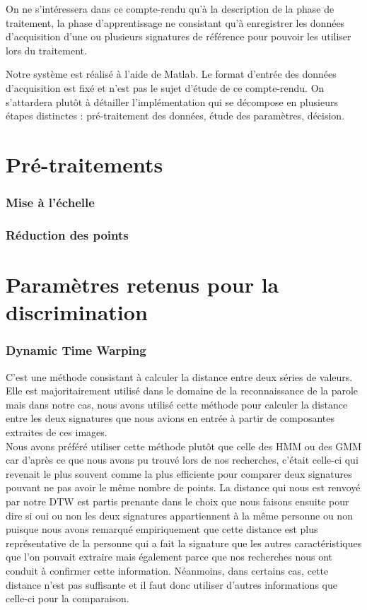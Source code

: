 \documentclass[fontsize=12pt, twoside=no]{scrartcl} %
\begin{document}
On ne s'intéressera dans ce compte-rendu qu'à la description de la phase de traitement, la phase d'apprentissage ne consistant qu'à enregistrer les données d'acquisition d'une ou plusieurs signatures de référence pour pouvoir les utiliser lors du traitement.

Notre système est réalisé à l'aide de Matlab. Le format d'entrée des données d'acquisition est fixé et n'est pas le sujet d'étude de ce compte-rendu. On s'attardera plutôt à détailler l'implémentation qui se décompose en plusieurs étapes distinctes : pré-traitement des données, étude des paramètres, décision.

\part{Pré-traitements}

\section{Mise à l'échelle}
\section{Réduction des points}

\part{Paramètres retenus pour la discrimination}

\section{Dynamic Time Warping}

C'est une méthode consistant à calculer la distance entre deux séries de valeurs. Elle est majoritairement utilisé dans le domaine de la reconnaissance de la parole mais dans notre cas, nous avons utilisé cette méthode pour calculer la distance entre les deux signatures que nous avions en entrée à partir de composantes extraites de ces images. \\

Nous avons préféré utiliser cette méthode plutôt que celle des HMM ou des GMM car d'après ce que nous avons pu trouvé lors de nos recherches, c'était celle-ci qui revenait le plus souvent comme la plus efficiente pour comparer deux signatures pouvant ne pas avoir le même nombre de points. La distance qui nous est renvoyé par notre DTW est partis prenante dans le choix que nous faisons ensuite pour dire si oui ou non les deux signatures appartiennent à la même personne ou non puisque nous avons remarqué empiriquement que cette distance est plus représentative de la personne qui a fait la signature que les autres caractéristiques que l'on pouvait extraire mais également parce que nos recherches nous ont conduit à confirmer cette information. Néanmoins, dans certains cas, cette distance n'est pas suffisante et il faut donc utiliser d'autres informations que celle-ci pour la comparaison.
\end{document}
